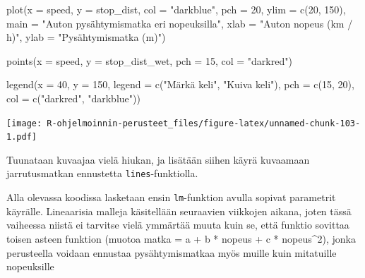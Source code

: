\documentclass[
]{book}
\newenvironment{Shaded}{\begin{snugshade}}{\end{snugshade}}
\newcommand{\AttributeTok}[1]{\textcolor[rgb]{0.77,0.63,0.00}{#1}}
\newcommand{\DecValTok}[1]{\textcolor[rgb]{0.00,0.00,0.81}{#1}}
\newcommand{\FunctionTok}[1]{\textcolor[rgb]{0.00,0.00,0.00}{#1}}
\newcommand{\NormalTok}[1]{#1}
\newcommand{\StringTok}[1]{\textcolor[rgb]{0.31,0.60,0.02}{#1}}
\begin{document}
\begin{Shaded}
\begin{Highlighting}[]
\FunctionTok{plot}\NormalTok{(}\AttributeTok{x =}\NormalTok{ speed, }\AttributeTok{y =}\NormalTok{ stop\_dist,}
     \AttributeTok{col =} \StringTok{"darkblue"}\NormalTok{, }\AttributeTok{pch =} \DecValTok{20}\NormalTok{,}
     \AttributeTok{ylim =} \FunctionTok{c}\NormalTok{(}\DecValTok{20}\NormalTok{, }\DecValTok{150}\NormalTok{),}
     \AttributeTok{main =} \StringTok{"Auton pysähtymismatka eri nopeuksilla"}\NormalTok{,}
     \AttributeTok{xlab =} \StringTok{"Auton nopeus (km / h)"}\NormalTok{, }\AttributeTok{ylab =} \StringTok{"Pysähtymismatka (m)"}\NormalTok{)}

\FunctionTok{points}\NormalTok{(}\AttributeTok{x =}\NormalTok{ speed, }\AttributeTok{y =}\NormalTok{ stop\_dist\_wet, }\AttributeTok{pch =} \DecValTok{15}\NormalTok{, }\AttributeTok{col =} \StringTok{"darkred"}\NormalTok{)}

\FunctionTok{legend}\NormalTok{(}\AttributeTok{x =} \DecValTok{40}\NormalTok{, }\AttributeTok{y =} \DecValTok{150}\NormalTok{,}
       \AttributeTok{legend =} \FunctionTok{c}\NormalTok{(}\StringTok{"Märkä keli"}\NormalTok{, }\StringTok{"Kuiva keli"}\NormalTok{),}
       \AttributeTok{pch =} \FunctionTok{c}\NormalTok{(}\DecValTok{15}\NormalTok{, }\DecValTok{20}\NormalTok{), }\AttributeTok{col =} \FunctionTok{c}\NormalTok{(}\StringTok{"darkred"}\NormalTok{, }\StringTok{"darkblue"}\NormalTok{))}
\end{Highlighting}
\end{Shaded}

\texttt{[image: R-ohjelmoinnin-perusteet\_files/figure-latex/unnamed-chunk-103-1.pdf]}

Tuunataan kuvaajaa vielä hiukan, ja lisätään siihen käyrä kuvaamaan jarrutusmatkan ennustetta \texttt{lines}-funktiolla.

Alla olevassa koodissa lasketaan ensin \texttt{lm}-funktion avulla sopivat parametrit käyrälle. Lineaarisia malleja käsitellään seuraavien viikkojen aikana, joten tässä vaiheessa niistä ei tarvitse vielä ymmärtää muuta kuin se, että funktio sovittaa toisen asteen funktion (muotoa matka = a + b * nopeus + c * nopeus\^{}2), jonka perusteella voidaan ennustaa pysähtymismatkaa myös muille kuin mitatuille nopeuksille
\end{document}
